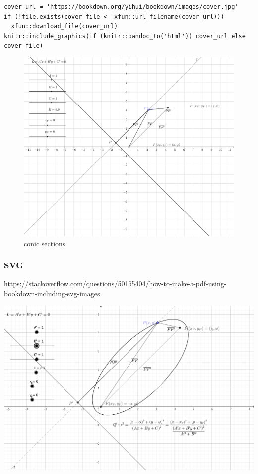 \documentclass[
]{book}
\theoremstyle{definition}
\theoremstyle{definition}
\theoremstyle{definition}
\theoremstyle{definition}
\theoremstyle{remark}
\begin{document}
\begin{verbatim}
cover_url = 'https://bookdown.org/yihui/bookdown/images/cover.jpg'
if (!file.exists(cover_file <- xfun::url_filename(cover_url)))
  xfun::download_file(cover_url)
knitr::include_graphics(if (knitr::pandoc_to('html')) cover_url else cover_file)
\end{verbatim}

\begin{figure}
\includegraphics[width=0.75\linewidth]{202401280001-test_files/figure-latex/unnamed-chunk-21-1} \caption{conic sections}\label{fig:unnamed-chunk-21}
\end{figure}

\hypertarget{svg}{%
\subsubsection{SVG}\label{svg}}

\url{https://stackoverflow.com/questions/50165404/how-to-make-a-pdf-using-bookdown-including-svg-images}

\includegraphics{img/conic-sections.pdf}
\end{document}
